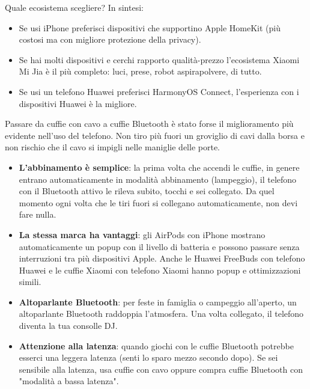 Quale ecosistema scegliere? In sintesi:

\begin{itemize}
  \item Se usi iPhone preferisci dispositivi che supportino Apple HomeKit (più costosi ma con migliore protezione della privacy).
  \item Se hai molti dispositivi e cerchi rapporto qualità-prezzo l'ecosistema Xiaomi Mi Jia è il più completo: luci, prese, robot aspirapolvere, di tutto.
  \item Se usi un telefono Huawei preferisci HarmonyOS Connect, l'esperienza con i dispositivi Huawei è la migliore.
\end{itemize}


Passare da cuffie con cavo a cuffie Bluetooth è stato forse il miglioramento più evidente nell'uso del telefono. Non tiro più fuori un groviglio di cavi dalla borsa e non rischio che il cavo si impigli nelle maniglie delle porte.

\begin{itemize}
  \item \textbf{L'abbinamento è semplice}: la prima volta che accendi le cuffie, in genere entrano automaticamente in modalità abbinamento (lampeggio), il telefono con il Bluetooth attivo le rileva subito, tocchi e sei collegato. Da quel momento ogni volta che le tiri fuori si collegano automaticamente, non devi fare nulla.
  \item \textbf{La stessa marca ha vantaggi}: gli AirPods con iPhone mostrano automaticamente un popup con il livello di batteria e possono passare senza interruzioni tra più dispositivi Apple. Anche le Huawei FreeBuds con telefono Huawei e le cuffie Xiaomi con telefono Xiaomi hanno popup e ottimizzazioni simili.
  \item \textbf{Altoparlante Bluetooth}: per feste in famiglia o campeggio all'aperto, un altoparlante Bluetooth raddoppia l'atmosfera. Una volta collegato, il telefono diventa la tua consolle DJ.
  \item \textbf{Attenzione alla latenza}: quando giochi con le cuffie Bluetooth potrebbe esserci una leggera latenza (senti lo sparo mezzo secondo dopo). Se sei sensibile alla latenza, usa cuffie con cavo oppure compra cuffie Bluetooth con "modalità a bassa latenza".
\end{itemize}


